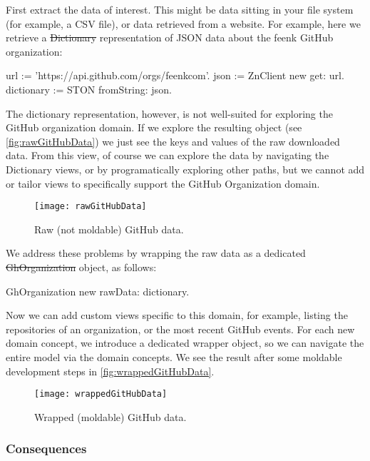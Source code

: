 \documentclass[sigconf]{acmart}
\renewcommand{\nbc}[3]{} %
\newcommand\tg[1]{\nbc{TG}{#1}{blue}}
\newcommand\eog[1]{\nbc{Edward}{#1}{purple}}
\begin{document}
First extract the data of interest.
This might be data sitting in your file system (for example, a CSV file), or data retrieved from a website.
For example, here we retrieve a \st{Dictionary} representation of JSON data about the feenk GitHub organization:

\begin{code}
url := 'https://api.github.com/orgs/feenkcom'.
json := ZnClient new get: url.
dictionary := STON fromString: json.
\end{code}

\eog{Would love to see the goal or motivation earlier for this kind of jazz.}

The dictionary representation, however, is not well-suited for exploring the GitHub organization domain.
If we explore the resulting object (see \autoref{fig:rawGitHubData}) we just see the keys and values of the raw downloaded data.
From this view, of course we can explore the data by navigating the Dictionary views, or by programatically exploring other paths, but we cannot add or tailor views to specifically support the GitHub Organization domain.

\begin{figure}[h]
  \texttt{[image: rawGitHubData]}
  \caption{Raw (not moldable) GitHub data.}
  \label{fig:rawGitHubData}
\end{figure}

We address these problems by wrapping the raw data as a dedicated \st{GhOrganization} object, as follows:

\begin{code}
GhOrganization new rawData: dictionary.
\end{code}

Now we can add custom views specific to this domain, for example, listing the repositories of an organization, or the most recent GitHub events.
For each new domain concept, we introduce a dedicated wrapper object, so we can navigate the entire model via the domain concepts.
We see the result after some moldable development steps in \autoref{fig:wrappedGitHubData}.

\begin{figure}[h]
  \texttt{[image: wrappedGitHubData]}
  \caption{Wrapped (moldable) GitHub data.}
  \label{fig:wrappedGitHubData}
\end{figure}

\subsubsection*{Consequences}
\end{document}
